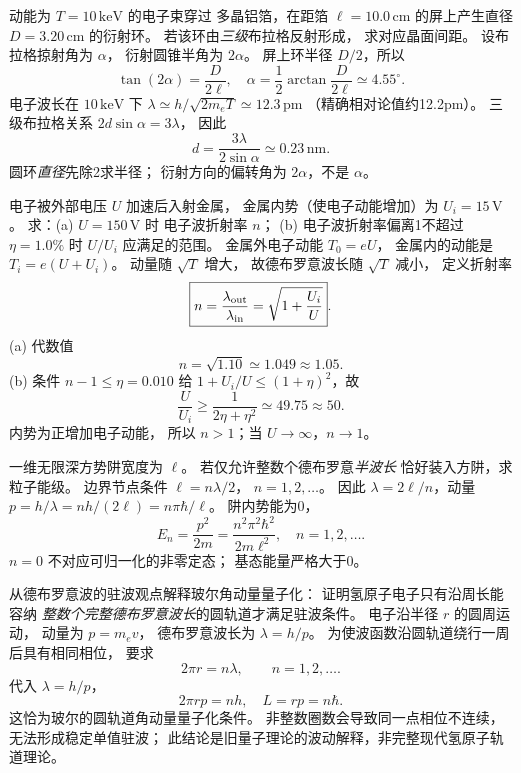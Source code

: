 动能为 $T=10\,\mathrm{keV}$ 的电子束穿过
多晶铝箔，在距箔 $\ell=10.0\,\mathrm{cm}$
的屏上产生直径 $D=3.20\,\mathrm{cm}$ 的衍射环。
若该环由\emph{三级}布拉格反射形成，
求对应晶面间距。
\exsolution
设布拉格掠射角为 $\alpha$，
衍射圆锥半角为 $2\alpha$。
屏上环半径 $D/2$，所以
\[
 \tan(2\alpha)=\frac{D}{2\ell},
 \quad\alpha=\frac12\arctan\frac{D}{2\ell}
 \simeq4.55^\circ.
\]
电子波长在 $10\,\mathrm{keV}$ 下
$\lambda\simeq h/\sqrt{2m_eT}\simeq12.3\,\mathrm{pm}$
（精确相对论值约12.2pm）。
三级布拉格关系
$2d\sin\alpha=3\lambda$，
因此
\[
 \boxed{d=\frac{3\lambda}{2\sin\alpha}
 \simeq0.23\,\mathrm{nm}}.
\]
\excheck 圆环\emph{直径}先除2求半径；
衍射方向的偏转角为 $2\alpha$，不是 $\alpha$。

电子被外部电压 $U$ 加速后入射金属，
金属内势（使电子动能增加）为
$U_i=15\,\mathrm V$。
求：(a) $U=150\,\mathrm V$ 时
电子波折射率 $n$；
(b) 电子波折射率偏离1不超过
$\eta=1.0\%$ 时 $U/U_i$ 应满足的范围。
\exsolution
金属外电子动能 $T_0=eU$，
金属内的动能是 $T_i=e(U+U_i)$。
动量随 $\sqrt T$ 增大，
故德布罗意波长随 $\sqrt T$ 减小，
定义折射率
\[
 \boxed{n=\frac{\lambda_{\rm out}}{\lambda_{\rm in}}
 =\sqrt{1+\frac{U_i}{U}}}.
\]
(a) 代数值
\[
 \boxed{n=\sqrt{1.10}\simeq1.049\approx1.05}.
\]
(b) 条件 $n-1\le\eta=0.010$ 给
$1+U_i/U\le(1+\eta)^2$，故
\[
 \boxed{\frac U{U_i}\ge
 \frac1{2\eta+\eta^2}\simeq49.75\approx50}.
\]
\excheck 内势为正增加电子动能，
所以 $n>1$；当 $U\to\infty$，$n\to1$。

一维无限深方势阱宽度为 $\ell$。
若仅允许整数个德布罗意\emph{半波长}
恰好装入方阱，求粒子能级。
\exsolution
边界节点条件
$\ell=n\lambda/2$，
$n=1,2,\dots$。
因此
$\lambda=2\ell/n$，动量
$p=h/\lambda=nh/(2\ell)=n\pi\hbar/\ell$。
阱内势能为0，
\[
 \boxed{E_n=\frac{p^2}{2m}
 =\frac{n^2\pi^2\hbar^2}{2m\ell^2}},
 \quad n=1,2,\dots.
\]
\excheck $n=0$ 不对应可归一化的非零定态；
基态能量严格大于0。

从德布罗意波的驻波观点解释玻尔角动量量子化：
证明氢原子电子只有沿周长能容纳
\emph{整数个完整德布罗意波长}的圆轨道才满足驻波条件。
\exsolution
电子沿半径 $r$ 的圆周运动，
动量为 $p=m_ev$，
德布罗意波长为
$\lambda=h/p$。
为使波函数沿圆轨道绕行一周后具有相同相位，
要求
\[
 2\pi r=n\lambda,\qquad n=1,2,\dots.
\]
代入 $\lambda=h/p$，
\[
 2\pi rp=nh,\quad
 \boxed{L=rp=n\hbar}.
\]
这恰为玻尔的圆轨道角动量量子化条件。
\excheck 非整数圈数会导致同一点相位不连续，
无法形成稳定单值驻波；
此结论是旧量子理论的波动解释，非完整现代氢原子轨道理论。


